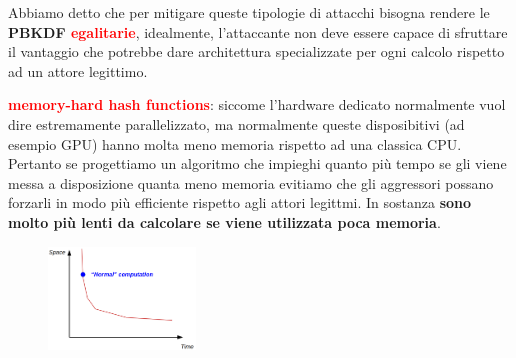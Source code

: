 \begin{flushleft}
    \smallskip

    Abbiamo detto che per mitigare queste tipologie di attacchi bisogna rendere le \textbf{PBKDF \textcolor{red}{egalitarie}}, idealmente, l'attaccante non deve essere capace di sfruttare il vantaggio che potrebbe dare architettura specializzate per ogni calcolo rispetto ad un attore legittimo.

    \smallskip

    \textcolor{red}{\textbf{memory-hard hash functions}}: siccome l'hardware dedicato normalmente vuol dire estremamente parallelizzato, ma normalmente queste disposibitivi (ad esempio GPU) hanno molta meno memoria rispetto ad una classica CPU. Pertanto se progettiamo un algoritmo che impieghi quanto più tempo se gli viene messa a disposizione quanta meno memoria evitiamo che gli aggressori possano forzarli in modo più efficiente rispetto agli attori legittmi. In sostanza \textbf{sono molto più lenti da calcolare se viene utilizzata poca memoria}.

    \begin{figure}[h]
        \centering
        \includegraphics[width=0.35\textwidth]{img/mhf.png}
    \end{figure}


\end{flushleft}

